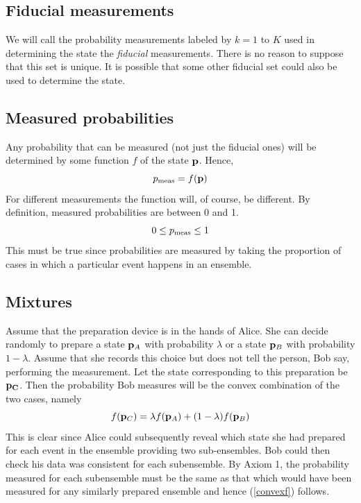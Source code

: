 \documentclass[10pt,twocolumn]{article}
\begin{document}
\subsection{Fiducial measurements}

We will call the probability measurements
labeled by $k=1$ to $K$ used in determining the state the {\it fiducial}
measurements.  There is no reason to suppose that this set is unique.  It
is possible that some other fiducial set could also be used to determine
the state.  

\subsection{Measured probabilities}

Any probability that can be measured (not just the
fiducial ones) will be determined by some function $f$ of
the state ${\bf p}$.  Hence,
\begin{equation}
p_{\rm meas}= f({\bf p})
\end{equation}
For different measurements the function will, of course, be different.
By definition, measured probabilities are between 0 and 1.
\[    0\leq p_{\rm meas} \leq 1 \]
This must be true since probabilities are measured by taking the proportion
of cases in which a particular event happens in an ensemble.

\subsection{Mixtures}


Assume that
the preparation device is in the hands of Alice.  She can decide randomly
to prepare a state ${\bf p}_A$ with probability $\lambda$ or a state
${\bf p}_B$ with probability $1-\lambda$.  Assume that she records this choice
but does not tell the person, Bob say, performing the measurement.
Let the state corresponding to this preparation be ${\bf p_C}$.  Then
the probability Bob measures will be the convex
combination of the two cases, namely
\begin{equation}\label{convexf}
f({\bf p}_C) = \lambda f({\bf p}_A)
+(1-\lambda) f({\bf p}_B)
\end{equation}
This is clear since Alice could subsequently reveal which
state she had prepared for each event in the ensemble providing two
sub-ensembles.  Bob could then check his data was consistent for each
subensemble.  By Axiom 1, the probability measured for each subensemble
must be the same as that which would have been measured for any
similarly prepared ensemble and hence (\ref{convexf}) follows.
\end{document}
